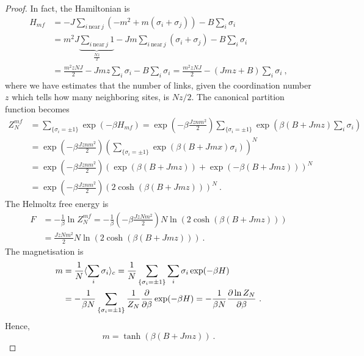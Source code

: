     \begin{proof}
        In fact, the Hamiltonian is 
        \begin{equation*}
        \begin{aligned}
            H_{mf} & = - J \sum_{i~\text{near}~j}  (- m^2 + m(\sigma_i + \sigma_j)) - B \sum_i \sigma_i \\ & = m^2 J \underbrace{\sum_{i~\text{near}~j} 1}_{\frac{Nz}{2}} - J m \sum_{i~\text{near}~j}  (\sigma_i + \sigma_j) - B \sum_i \sigma_i \\ & = \frac{m^2 z N J}{2} - Jmz \sum_i \sigma_i - B \sum_i \sigma_i = \frac{m^2 z N J}{2} - (J m z + B) \sum_i \sigma_i ~,
        \end{aligned}
        \end{equation*}
        where we have estimates that the number of links, given the coordination number $z$ which tells how many neighboring sites, is $Nz/2$.
        The canonical partition function becomes
        \begin{equation*}
        \begin{aligned}
            Z_N^{mf} & = \sum_{\{\sigma_i = \pm 1\}} \exp(- \beta H_{mf}) = \exp(- \beta \frac{J z n m^2}{2}) \sum_{\{\sigma_i = \pm 1\}} \exp(\beta (B + Jmz) \sum_i \sigma_i) \\ & = \exp(- \beta \frac{J z n m^2}{2}) (\sum_{\{\sigma_i = \pm 1\}} \exp(\beta (B + Jmx) \sigma_i))^N \\ & = \exp(- \beta \frac{J z n m^2}{2}) (\exp(\beta(B + Jmz)) + \exp(- \beta (B + Jmz)))^N \\ & = \exp(- \beta \frac{J z n m^2}{2}) (2 \cosh (\beta (B + Jmz)))^N ~.
        \end{aligned}
        \end{equation*}
        The Helmoltz free energy is 
        \begin{equation*}
        \begin{aligned}
            F & = - \frac{1}{\beta} \ln Z_N^{mf} = - \frac{1}{\beta} (- \beta \frac{J z N m^2}{2}) N \ln (2 \cosh (\beta (B + Jmz))) \\ & = \frac{J z N m^2}{2} N \ln (2 \cosh (\beta (B + Jmz))) ~.
        \end{aligned}
        \end{equation*}
        The magnetisation is 
        \begin{equation*}
        \begin{aligned}
             m & = \frac{1}{N} \langle\sum_i \sigma_i\rangle_c = \frac{1}{N} \sum_{\{\sigma_i = \pm 1\}} \sum_i \sigma_i \exp(- \beta H) \\ & = - \frac{1}{\beta N} \sum_{\{\sigma_i = \pm 1\}} \frac{1}{Z_N} \frac{\partial}{\partial\beta} \exp(- \beta H) = - \frac{1}{\beta N} \frac{\partial\ln Z_N}{\partial\beta} ~.
        \end{aligned}
        \end{equation*}
        Hence, 
        \begin{equation*}
            m = \tanh (\beta (B + J m z)) ~.
        \end{equation*}
    \end{proof}
    
